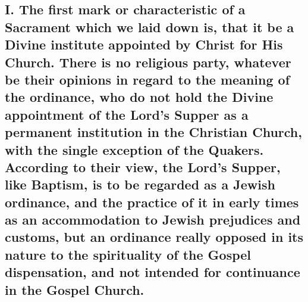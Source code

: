 \documentclass[]{book}
\begin{document}
\hypertarget{i.-the-first-mark-or-characteristic-of-a-sacrament-which-we-laid-down-is-that-it-be-a-divine-institute-appointed-by-christ-for-his-church.-there-is-no-religious-party-whatever-be-their-opinions-in-regard-to-the-meaning-of-the-ordinance-who-do-not-hold-the-divine-appointment-of-the-lords-supper-as-a-permanent-institution-in-the-christian-church-with-the-single-exception-of-the-quakers.-according-to-their-view-the-lords-supper-like-baptism-is-to-be-regarded-as-a-jewish-ordinance-and-the-practice-of-it-in-early-times-as-an-accommodation-to-jewish-prejudices-and-customs-but-an-ordinance-really-opposed-in-its-nature-to-the-spirituality-of-the-gospel-dispensation-and-not-intended-for-continuance-in-the-gospel-church.}{%
\subsection{I. The first mark or characteristic of a Sacrament which we laid down is, that it be a Divine institute appointed by Christ for His Church. There is no religious party, whatever be their opinions in regard to the meaning of the ordinance, who do not hold the Divine appointment of the Lord's Supper as a permanent institution in the Christian Church, with the single exception of the Quakers. According to their view, the Lord's Supper, like Baptism, is to be regarded as a Jewish ordinance, and the practice of it in early times as an accommodation to Jewish prejudices and customs, but an ordinance really opposed in its nature to the spirituality of the Gospel dispensation, and not intended for continuance in the Gospel Church.}\label{i.-the-first-mark-or-characteristic-of-a-sacrament-which-we-laid-down-is-that-it-be-a-divine-institute-appointed-by-christ-for-his-church.-there-is-no-religious-party-whatever-be-their-opinions-in-regard-to-the-meaning-of-the-ordinance-who-do-not-hold-the-divine-appointment-of-the-lords-supper-as-a-permanent-institution-in-the-christian-church-with-the-single-exception-of-the-quakers.-according-to-their-view-the-lords-supper-like-baptism-is-to-be-regarded-as-a-jewish-ordinance-and-the-practice-of-it-in-early-times-as-an-accommodation-to-jewish-prejudices-and-customs-but-an-ordinance-really-opposed-in-its-nature-to-the-spirituality-of-the-gospel-dispensation-and-not-intended-for-continuance-in-the-gospel-church.}}
\end{document}
